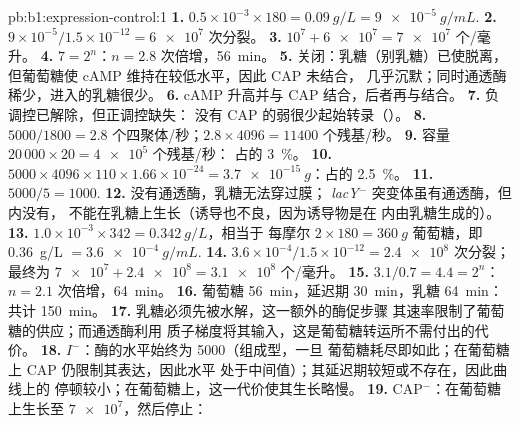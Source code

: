 \begin{solution}{pb:b1:expression-control:1}
\textbf{1.} $0.5\times 10^{-3}\times 180 = \qty{0.09}{g/L} =
\qty{9e-5}{g/mL}$.
\textbf{2.} $9\times 10^{-5}/1.5\times 10^{-12} = \num{6e7}$ 次分裂。
\textbf{3.} $10^7 + \num{6e7} = \num{7e7}$ 个/毫升。
\textbf{4.} $7 = 2^n$：$n = 2.8$ 次倍增，\qty{56}{min}。
\textbf{5.} 关闭：乳糖（别乳糖）已使脱离，
但葡萄糖使 cAMP 维持在较低水平，因此 CAP 未结合，
几乎沉默；同时通透酶稀少，进入的乳糖很少。
\textbf{6.} cAMP 升高并与 CAP 结合，后者再与结合。
\textbf{7.} 负调控已解除，但正调控缺失：
没有 CAP 的弱很少起始转录（）。
\textbf{8.} $5000/1800 = 2.8$ 个四聚体/秒；$2.8\times 4096 =
\num{11400}$ 个残基/秒。
\textbf{9.} 容量 $20\,000\times 20 = \num{4e5}$ 个残基/秒：
占的 \qty{3}{\%}。
\textbf{10.} $5000\times 4096\times 110\times 1.66\times 10^{-24} =
\qty{3.7e-15}{g}$：占的 \qty{2.5}{\%}。
\textbf{11.} $5000/5 = 1000$.
\textbf{12.} 没有通透酶，乳糖无法穿过膜；
\emph{lacY}$^-$ 突变体虽有通透酶，但内没有，
不能在乳糖上生长（诱导也不良，因为诱导物是在
内由乳糖生成的）。
\textbf{13.} $1.0\times 10^{-3}\times 342 = \qty{0.342}{g/L}$，相当于
每摩尔 $2\times 180 = \qty{360}{g}$ 葡萄糖，即 \qty{0.36}{g/L}
$= \qty{3.6e-4}{g/mL}$.
\textbf{14.} $3.6\times 10^{-4}/1.5\times 10^{-12} = \num{2.4e8}$
次分裂；最终为 $\num{7e7} + \num{2.4e8} = \num{3.1e8}$ 个/毫升。
\textbf{15.} $3.1/0.7 = 4.4 = 2^n$：$n = 2.1$ 次倍增，\qty{64}{min}。
\textbf{16.} 葡萄糖 \qty{56}{min}，延迟期 \qty{30}{min}，乳糖
\qty{64}{min}：共计 \qty{150}{min}。
\textbf{17.} 乳糖必须先被水解，这一额外的酶促步骤
其速率限制了葡萄糖的供应；而通透酶利用
质子梯度将其输入，这是葡萄糖转运所不需付出的代价。
\textbf{18.} $I^-$：酶的水平始终为 \num{5000}（组成型，一旦
葡萄糖耗尽即如此；在葡萄糖上 CAP 仍限制其表达，因此水平
处于中间值）；其延迟期较短或不存在，因此曲线上的
停顿较小；在葡萄糖上，这一代价使其生长略慢。
\textbf{19.} CAP$^-$：在葡萄糖上生长至 $\num{7e7}$，然后停止：

\end{solution}
